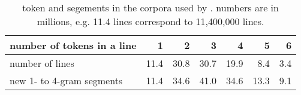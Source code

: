 \begin{table}[t]
 \caption{token and segements in the corpora used by \citet{Risvik:2003}. numbers are in millions, e.g. 11.4 lines correspond to 11,400,000 lines.}
 \label{table-token-segments-risvik-2003}
 \centering
 \small
 \begin{tabular}{@{}lrrrrrr@{}}
  \toprule
 number of tokens in a line & 1 & 2 & 3 & 4 & 5 & 6 \\
  \midrule
  number of lines & 11.4 & 30.8 & 30.7 & 19.9 & 8.4 & 3.4  \\
  new 1- to 4-gram segments & 11.4 & 34.6 & 41.0 & 34.6 & 13.3 & 9.1 \\
  \bottomrule
 \end{tabular}
\end{table}
